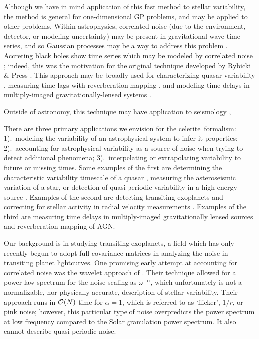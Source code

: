 \documentclass[manuscript, letterpaper]{aastex6}
\makeatletter
\let\origsection\section
\renewcommand\section{\@ifstar{\starsection}{\nostarsection}}
\newcommand\nostarsection[1]{\sectionprelude\origsection{#1}}
\newcommand\starsection[1]{\sectionprelude\origsection*{#1}}
\newcommand\sectionprelude{\vspace{1em}}
\newcommand{\project}[1]{\textsf{#1}}
\newcommand{\celerite}{\project{celerite}}
\makeatother
\begin{document}
\section{Summary}

Although we have in mind application of this fast method to stellar variability,
the method is general for one-dimensional GP problems, and may be applied to
other problems.    Within astrophysics, correlated noise (due to the environment,
detector, or modeling uncertainty) may be present in
gravitational wave time series, and so Gaussian processes may be a way to address
this problem \citep{Moore:2016}.  Accreting black holes show time series which
may be modeled by correlated noise \citep{Kelly:2014};  indeed, this was the
motivation for the original technique developed by Rybicki \& Press \citep{Rybicki:1992,Rybicki:1995}.
This approach may be broadly used for characterizing quasar variability
\citep{MacLeod:2010}, measuring time lags with reverberation mapping
\citep{Zu:2011}, and modeling time delays in multiply-imaged
gravitationally-lensed systems \citep{Press:1998}.

Outside of astronomy, this technique may have application to seismology
\citep{Robinson:1967},

There are three primary applications we envision for the \celerite\ formalism: 1).\ modeling
the variability of an astrophysical system to infer it properties; 2).\
accounting for astrophysical variability as a source of noise when trying to detect
additional phenomena; 3).\ interpolating or extrapolating variability to future or missing
times.  Some examples of the first are determining the characteristic
variability timescale of a quasar \citep{Kelly:2014}, measuring the asteroseismic variation of a star,
or detection of quasi-periodic variability in a high-energy source \citep{McAllister2016}.  
Examples of the
second are detecting transiting exoplanets and correcting for stellar activity in
radial velocity measurements \citep{Haywood2014,Rajpaul2015}. Examples of the third are 
measuring time delays in
multiply-imaged gravitationally lensed sources and reverberation mapping of AGN.

Our background is in studying transiting exoplanets, a field which has only recently begun
to adopt full covariance matrices in analyzing the noise in transiting planet lightcurves.
One promising early attempt at accounting for correlated noise was the wavelet approach
of \citet{Carter2009}.  Their technique allowed for a power-law spectrum for the
noise scaling as $\omega^{-\alpha}$, which unfortunately is not a normalizable, nor
physically-accurate, description of stellar variability.  Their approach runs in
${\cal O}(N)$ time for $\alpha=1$, which is referred to as `flicker', $1/r$, or pink 
noise;  however, this particular type of noise overpredicts the power spectrum at low 
frequency compared to the Solar granulation power spectrum.  It also cannot describe 
quasi-periodic noise.
\end{document}

